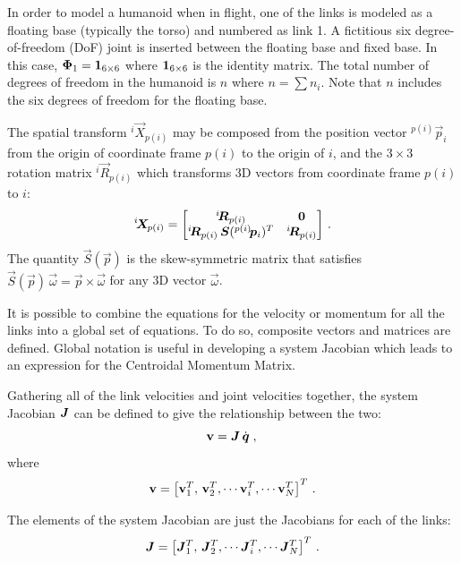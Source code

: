 \documentclass{llncs}
\newcommand{\bJ}{\mbox{\boldmath $J$}}
\newcommand{\bq}{\mbox{\boldmath $q$}}
\newcommand{\bzero}{\mbox{\boldmath $0$}}
\newcommand{\vp}{\vec{p}}
\newcommand{\BM}{\begin{bmatrix}}
\newcommand{\EM}{\end{bmatrix}}
\newcommand{\vPhi}{\vec{\Phi}}
\newcommand{\vomega}{\vec{\omega}}
\newcommand{\bone}{{\bf 1}}
\newcommand{\vJ}{\vec{J}}
\newcommand{\Pos}[2]{{}^{#1}\!\vp_{#2}}
\newcommand{\bqd}{\dot{\bq}}
\newcommand{\vR}{\vec{R}}
\newcommand{\Rot}[2]{{}^{#1}\!\vR_{#2}}
\newcommand{\vS}{\vec{S}}
\newcommand{\bv}{{\bf v}}
\newcommand{\vX}{\vec{X}}
\newcommand{\XM}[2]{{}^{#1}\!\vX_{\!#2}}
\begin{document}
In order to model a humanoid when in flight, one of the links is
modeled as a floating base (typically the torso) and numbered as link 1.
A fictitious six degree-of-freedom (DoF) joint is inserted between the
floating base and fixed base.  In this case, $\vPhi_1 = \bone_{6 \times 6}$
where $\bone_{6 \times 6}$ is the identity matrix.  The total number of degrees of freedom in the
humanoid is $n$ where $n= \sum n_i$.  Note that $n$ includes the
six degrees of freedom for the floating base.

The spatial transform $\XM{i}{p(i)}$ may be composed from the position
vector $\Pos{p(i)}{i}$ from the origin of coordinate frame $p(i)$ to
the origin of $i$, and
the $3 \times 3$ rotation matrix $\Rot{i}{p(i)}$ which transforms
3D vectors from coordinate frame $p(i)$ to $i$:
%
\begin{equation}
\label{eq:ST}
\XM{i}{p(i)}
= \BM \Rot{i}{p(i)} & \bzero \\
              \Rot{i}{p(i)} \,\vS(\Pos{p(i)}{i})^T & \Rot{i}{p(i)} \EM \, .
\end{equation}
%
The quantity $\vS(\vp)$ is the skew-symmetric matrix that satisfies
$\vS(\vp)\,\vomega = \vp \times \vomega$ for any 3D vector $\vomega$.

It is possible to combine the equations for the velocity or momentum
for all the links into a global set of equations.  To do
so, composite vectors and matrices are defined. %
Global notation is useful
in developing a system Jacobian which leads to an
expression for the Centroidal Momentum Matrix.

Gathering all of the link velocities and joint velocities together, the system Jacobian $\bJ$ can be defined to give the relationship between the two:
%
\begin{equation}
\label{eq:v}
\bv = \bJ \, \bqd \; ,\\
\end{equation}
%
where %
\begin{equation}
\bv = \left[ \bv_1^T, \, \bv_2^T, \cdots \bv_i^T, \cdots \bv_N^T \right]^T \, .
\end{equation}

The elements of the system Jacobian are just the Jacobians for each of the links:
%
\begin{equation}
\bJ = \left[ \vJ_1^T, \, \vJ_2^T, \cdots \vJ_i^T, \cdots \vJ_N^T \right]^T \, .
\end{equation}
\end{document}
